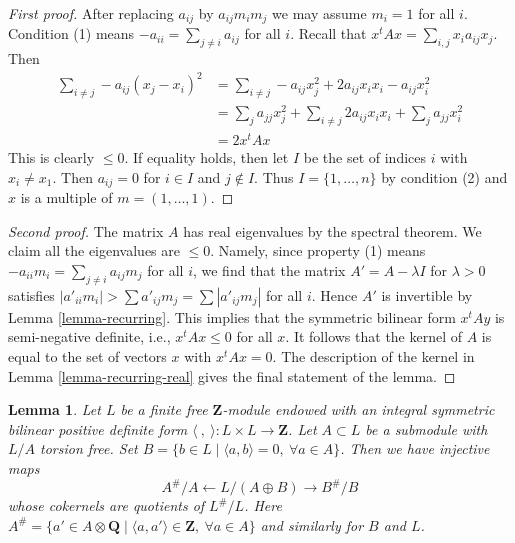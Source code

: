 \documentclass{stacks-project}
\theoremstyle{plain}
\newtheorem{lemma}[subsection]{Lemma}
\theoremstyle{definition}
\theoremstyle{remark}
\numberwithin{equation}{subsection}
\begin{document}
\begin{proof}[First proof]
After replacing $a_{ij}$ by $a_{ij}m_im_j$ we may assume $m_i = 1$
for all $i$. Condition (1) means $-a_{ii} = \sum_{j \not = i} a_{ij}$
for all $i$. Recall that $x^tAx = \sum_{i, j} x_ia_{ij}x_j$.
Then
\begin{align*}
\sum\nolimits_{i \not = j} -a_{ij}(x_j - x_i)^2 & =
\sum\nolimits_{i \not = j} -a_{ij}x_j^2 + 2a_{ij}x_ix_i - a_{ij}x_i^2 \\
& =
\sum\nolimits_j a_{jj} x_j^2 +
\sum\nolimits_{i \not = j} 2a_{ij}x_ix_i +
\sum\nolimits_j a_{jj} x_i^2 \\
& = 2x^tAx
\end{align*}
This is clearly $\leq 0$. If equality holds, then let $I$ be the set
of indices $i$ with $x_i \not = x_1$. Then $a_{ij} = 0$ for $i \in I$
and $j \not \in I$. Thus $I = \{1, \ldots, n\}$ by condition (2) and
$x$ is a multiple of $m = (1, \ldots, 1)$.
\end{proof}

\begin{proof}[Second proof]
The matrix $A$ has real eigenvalues by the spectral theorem.
We claim all the eigenvalues are $\leq 0$.
Namely, since property (1) means
$-a_{ii}m_i = \sum_{j \not = i} a_{ij}m_j$ for all $i$,
we find that the matrix $A' = A - \lambda I$ for $\lambda > 0$
satisfies $|a'_{ii}m_i| > \sum a'_{ij}m_j = \sum |a'_{ij}m_j|$ for all $i$.
Hence $A'$ is invertible by Lemma \ref{lemma-recurring}.
This implies that the symmetric bilinear form $x^tAy$
is semi-negative definite, i.e., $x^tAx \leq 0$ for all $x$.
It follows that the kernel of $A$ is equal
to the set of vectors $x$ with $x^tAx = 0$.
The description of the kernel in Lemma \ref{lemma-recurring-real}
gives the final statement of the lemma.
\end{proof}

\begin{lemma}
\label{lemma-orthogonal-direct-sum}
Let $L$ be a finite free $\mathbf{Z}$-module endowed
with an integral symmetric bilinear positive definite
form $\langle\ ,\ \rangle : L \times L \to \mathbf{Z}$.
Let $A \subset L$ be a submodule with $L/A$ torsion free. Set
$B = \{b \in L \mid \langle a, b\rangle = 0,\ \forall a \in A\}$.
Then we have injective maps
$$
A^\#/A \leftarrow L/(A \oplus B) \rightarrow B^\#/B
$$
whose cokernels are quotients of $L^\#/L$. Here
$A^\# = \{a' \in A \otimes \mathbf{Q} \mid
\langle a, a'\rangle \in \mathbf{Z},\ \forall a \in A\}$
and similarly for $B$ and $L$.
\end{lemma}
\end{document}
